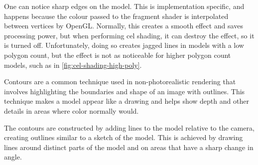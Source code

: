 One can notice sharp edges on the model. This is implementation specific, and happens because the 
colour passed to the fragment shader is interpolated between vertices by OpenGL. Normally, this creates 
a smooth effect and saves processing power, but when performing cel shading, it can destroy the effect, 
so it is turned off. Unfortunately, doing so creates jagged lines in models with a low polygon count, 
but the effect is  not as noticeable for higher polygon count models, such as in 
\autoref{fig:cel-shading-high-poly}. 

\newpage 

Contours are a common technique used in non-photorealistic rendering that involves highlighting 
the boundaries and shape of an image with outlines. This technique makes a model appear like a drawing 
and helps show depth and other details in areas where color normally would.

The contours are constructed by adding lines to the model relative to the camera, creating outlines 
similar to a sketch of the model. This is achieved by drawing lines around distinct parts of the model 
and on areas that have a sharp change in angle.

